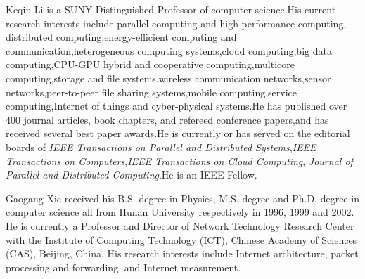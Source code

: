 \documentclass[10pt,journal,compsoc]{IEEEtran}
\begin{document}
\begin{IEEEbiography}{Keqin Li} is a SUNY Distinguished Professor of computer science.His current research interests include parallel computing and high-performance computing,
distributed computing,energy-efficient computing and communication,heterogeneous computing systems,cloud computing,big data computing,CPU-GPU hybrid and cooperative computing,multicore computing,storage and file systems,wireless communication networks,sensor networks,peer-to-peer file sharing systems,mobile computing,service computing,Internet of things and cyber-physical systems.He has published over 400 journal articles, book chapters, and refereed conference papers,and has received several best paper awards.He is currently or has served on the editorial boards of
{\em IEEE Transactions on Parallel and Distributed Systems},{\em IEEE Transactions on Computers},{\em IEEE Transactions on Cloud Computing},
{\em Journal of Parallel and Distributed Computing}.He is an IEEE Fellow.
\end{IEEEbiography}

\begin{IEEEbiography}{Gaogang Xie}
received his B.S. degree in Physics, M.S. degree and Ph.D. degree in computer science all from Hunan University respectively in 1996, 1999 and 2002. He is currently a Professor and Director of Network Technology Research Center with the Institute of Computing Technology (ICT), Chinese Academy of Sciences (CAS), Beijing, China. His research interests include Internet architecture, packet processing and forwarding, and Internet measurement.
\end{IEEEbiography}





\end{document}
